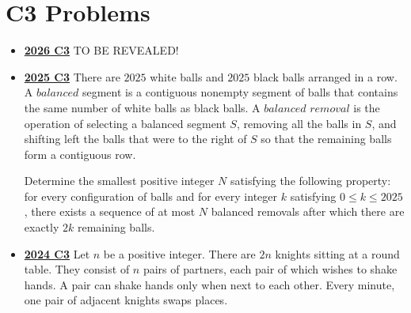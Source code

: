 \documentclass[11pt]{scrartcl}
\begin{document}
\section*{C3 Problems} \label{C3}
\begin{itemize}[leftmargin=*]


\item \href{https://www.imo-official.org/assets/documents/problems/2026/IMO2026SL.pdf}{\textbf{2026 C3}} TO BE REVEALED!

\item \href{https://artofproblemsolving.com/community/c6h3866891p38677080}{\textbf{2025 C3}} There are $2025$ white balls and $2025$ black balls arranged in a row. A $balanced$ segment is a contiguous nonempty segment of balls that contains the same number of white balls as black balls. A $balanced$ $removal$ is the operation of selecting a balanced segment $S$, removing all the balls in $S$, and shifting left the balls that were to the right of $S$ so that the remaining balls form a contiguous row.
    
Determine the smallest positive integer $N$ satisfying the following property: for every configuration of balls and for every integer $k$ satisfying $0 \leqslant k \leqslant 2025$, there exists a sequence of at most $N$ balanced removals after which there are exactly $2k$ remaining balls.
\item \href{https://artofproblemsolving.com/community/c6h3610441p35340911}{\textbf{2024 C3}} Let $n$ be a positive integer. There are $2n$ knights sitting at a round table. They consist of $n$ pairs of partners, each pair of which wishes to shake hands. A pair can shake hands only when next to each other. Every minute, one pair of adjacent knights swaps places. 


\end{itemize}
\end{document}
